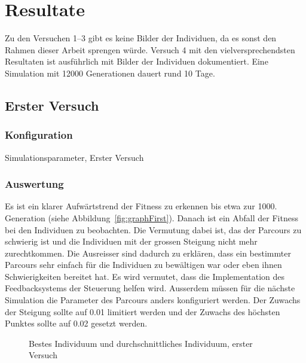 %
%

\chapter{Resultate\label{chap:Resultate}}

  Zu den Versuchen 1--3 gibt es keine Bilder der Individuen, da es sonst den Rahmen dieser Arbeit sprengen würde.
  Versuch 4 mit den vielversprechendsten Resultaten ist ausführlich mit Bilder der Individuen dokumentiert.
  Eine Simulation mit 12000 Generationen dauert rund 10 Tage.

  \section{Erster Versuch}

    \subsection{Konfiguration}

      \begin{table}[H]
        \centering
        
        \caption{Simulationsparameter, Erster Versuch}
      \end{table}

    \subsection{Auswertung}

      Es ist ein klarer Aufwärtstrend der Fitness zu erkennen bis etwa zur 1000. Generation (siehe Abbildung~\vref{fig:graphFirst}).
      Danach ist ein Abfall der Fitness bei den Individuen zu beobachten.
      Die Vermutung dabei ist, das der Parcours zu schwierig ist und die Individuen
      mit der grossen Steigung nicht mehr zurechtkommen.
      Die Ausreisser sind dadurch zu erklären,
      dass ein bestimmter Parcours sehr einfach für die Individuen zu bewältigen war oder eben ihnen Schwierigkeiten bereitet hat.
      Es wird vermutet, dass die Implementation des Feedbacksystems der Steuerung helfen wird.
      Ausserdem müssen für die nächste Simulation die Parameter des Parcours anders konfiguriert werden.
      Der Zuwachs der Steigung sollte auf 0.01 limitiert werden und der Zuwachs des höchsten Punktes
      sollte auf 0.02 gesetzt werden.

      \begin{figure}
        \centering
        
        \caption{Bestes Individuum und durchschnittliches Individuum, erster Versuch\label{fig:graphFirst}}
      \end{figure}

